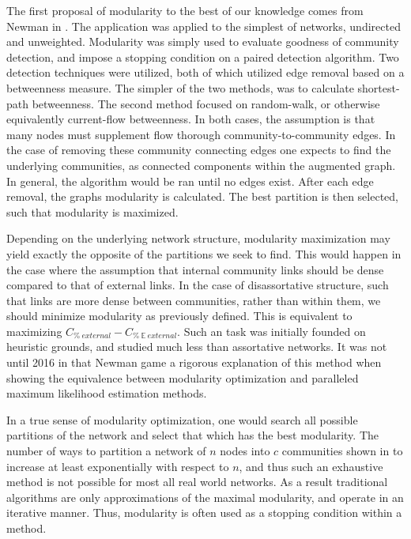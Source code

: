 \documentclass[a4paper, 10pt, twocolumn]{article}
\begin{document}
The first proposal of modularity to the best of our knowledge comes from Newman in \cite{finding_and_evaling_comm_struct}.
The application was applied to the simplest of networks, undirected and unweighted.
Modularity was simply used to evaluate goodness of community detection, and impose a stopping condition on a paired detection algorithm.
Two detection techniques were utilized, both of which utilized edge removal based on a betweenness measure.
The simpler of the two methods, was to calculate shortest-path betweenness.
The second method focused on random-walk, or otherwise equivalently current-flow betweenness.
In both cases, the assumption is that many nodes must supplement flow thorough community-to-community edges.
In the case of removing these community connecting edges one expects to find the underlying communities, as connected components within the augmented graph.
In general, the algorithm would be ran until no edges exist.
After each edge removal, the graphs modularity is calculated.
The best partition is then selected, such that modularity is maximized.

Depending on the underlying network structure, modularity maximization may yield exactly the opposite of the partitions we seek to find.
This would happen in the case where the assumption that internal community links should be dense compared to that of external links.
In the case of disassortative structure, such that links are more dense between communities, rather than within them, we should minimize modularity as previously defined.
This is equivalent to maximizing $ C_{\% \ external} - C_{\% \ \mathbb{E} \ external} $.
Such an task was initially founded on heuristic grounds, and studied much less than assortative networks.
It was not until 2016 in \cite{equivalence_between} that Newman game a rigorous explanation of this method when showing the equivalence between modularity optimization and paralleled maximum likelihood estimation methods.

In a true sense of modularity optimization, one would search all possible partitions of the network and select that which has the best modularity.
The number of ways to partition a network of $ n $ nodes into $ c $ communities shown in \cite{fast_algorithm} to increase at least exponentially with respect to $ n $, and thus such an exhaustive method is not possible for most all real world networks.
As a result traditional algorithms are only approximations of the maximal modularity, and operate in an iterative manner.
Thus, modularity is often used as a stopping condition within a method.
\end{document}
